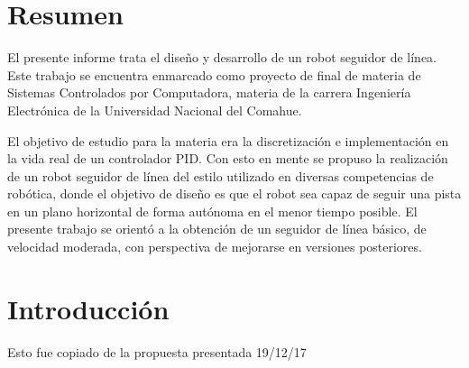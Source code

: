 \documentclass[10pt,conference,a4paper,onecolumn]{article}%
\begin{document}
\section{Resumen}
El presente informe trata el diseño y desarrollo de un robot seguidor de línea. Este trabajo se encuentra enmarcado como proyecto de final de materia de Sistemas Controlados por Computadora, materia de la carrera Ingeniería Electrónica de la Universidad Nacional del Comahue.

El objetivo de estudio para la materia era la discretización e implementación en la vida real de un controlador PID. Con esto en mente se propuso la realización de un robot seguidor de línea del estilo utilizado en diversas competencias de robótica, donde el objetivo de diseño es que el robot sea capaz de seguir una pista en un plano horizontal de forma autónoma en el menor tiempo posible. El presente trabajo se orientó a la obtención de un seguidor de línea básico, de velocidad moderada, con perspectiva de mejorarse en versiones posteriores.

\section{Introducción}
Esto fue copiado de la propuesta presentada 19/12/17
\end{document}

